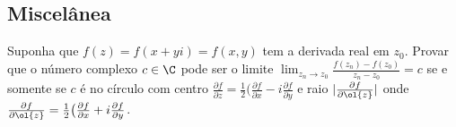 \subsection{Miscelânea}

\begin{prob}
Suponha que $f(z) = f(x+yi) = f(x,y)$ tem a derivada real em $z_0$.
Provar que o número complexo $c\in\C$ pode ser o limite
$\lim_{z_n\to z_0} \frac{f(z_n) - f(z_0)}{z_n-z_0} = c$
se e somente se $c$ é no círculo com centro
$\frac{\partial f}{\partial z} = \frac{1}{2}\big(\frac{\partial f}{\partial x} - i\frac{\partial f}{\partial y}$
e raio
$|\frac{\partial f}{\partial \ol{z}}|$
onde
$\frac{\partial f}{\partial \ol{z}} = \frac{1}{2}\big(\frac{\partial f}{\partial x} + i\frac{\partial f}{\partial y}$.
\end{prob}


